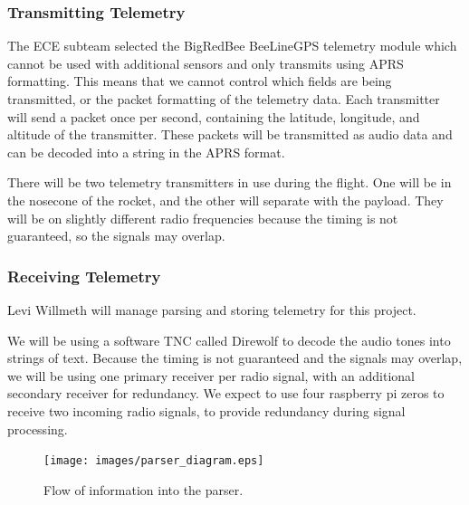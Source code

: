 \documentclass[onecolumn, draftclsnofoot, 10pt, compsoc]{IEEEtran}
\begin{document}
\subsubsection{Transmitting Telemetry}

The ECE subteam selected the BigRedBee BeeLineGPS telemetry module which cannot be used with additional sensors and only transmits using APRS formatting.  This means that we cannot control which fields are being transmitted, or the packet formatting of the telemetry data.  Each transmitter will send a packet once per second, containing the latitude, longitude, and altitude of the transmitter.  These packets will be transmitted as audio data and can be decoded into a string in the APRS format.

There will be two telemetry transmitters in use during the flight.  One will be in the nosecone of the rocket, and the other will separate with the payload.  They will be on slightly different radio frequencies because the timing is not guaranteed, so the signals may overlap.

\subsubsection{Receiving Telemetry}

Levi Willmeth will manage parsing and storing telemetry for this project.

We will be using a software TNC called Direwolf to decode the audio tones into strings of text.  Because the timing is not guaranteed and the signals may overlap, we will be using one primary receiver per radio signal, with an additional secondary receiver for redundancy.  We expect to use four raspberry pi zeros to receive two incoming radio signals, to provide redundancy during signal processing.


\begin{figure}[ht]
	\centering
	\texttt{[image: images/parser\_diagram.eps]}
    \caption{Flow of information into the parser.}
\end{figure}
\end{document}
